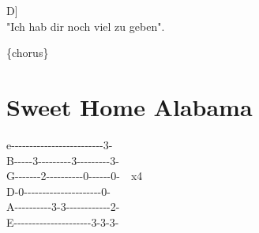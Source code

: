 \documentclass[
  letterpaper,
]{scrbook}
\begin{document}
\hspace*{0.333em}\hspace*{0.333em}\hspace*{0.333em}\hspace*{0.333em}\hspace*{0.333em}\hspace*{0.333em}\hspace*{0.333em}\hspace*{0.333em}\hspace*{0.333em}\hspace*{0.333em}\hspace*{0.333em}\hspace*{0.333em}\hspace*{0.333em}\hspace*{0.333em}\hspace*{0.333em}\hspace*{0.333em}\hspace*{0.333em}\hspace*{0.333em}\hspace*{0.333em}\hspace*{0.333em}\hspace*{0.333em}\hspace*{0.333em}\hspace*{0.333em}\hspace*{0.333em}\hspace*{0.333em}\hspace*{0.333em}\hspace*{0.333em}{[}D{]}\\
"Ich hab dir noch viel zu geben".

\{chorus\}

\hypertarget{sweet-home-alabama}{%
\chapter{Sweet Home Alabama}\label{sweet-home-alabama}}

e\textbar-\/-\/-\/-\/-\/-\/-\/-\/-\/-\/-\/-\/-\/-\/-\/-\/-\/-\/-\/-\/-\/-\/-\/-\/-3-\textbar{}\\
B\textbar-\/-\/-\/-\/-3-\/-\/-\/-\/-\/-\/-\/-\/-3-\/-\/-\/-\/-\/-\/-\/-\/-3-\textbar{}\\
G\textbar-\/-\/-\/-\/-\/-\/-2-\/-\/-\/-\/-\/-\/-\/-\/-\/-0-\/-\/-\/-\/-\/-0-\textbar~~x4\\
D-0-\/-\/-\/-\/-\/-\/-\/-\/-\/-\/-\/-\/-\/-\/-\/-\/-\/-\/-\/-\/-0-\textbar~~~~~\\
A\textbar-\/-\/-\/-\/-\/-\/-\/-\/-\/-3-3-\/-\/-\/-\/-\/-\/-\/-\/-\/-\/-\/-2-\textbar{}\\
E\textbar-\/-\/-\/-\/-\/-\/-\/-\/-\/-\/-\/-\/-\/-\/-\/-\/-\/-\/-\/-\/-3-3-3-\textbar{}
\end{document}
